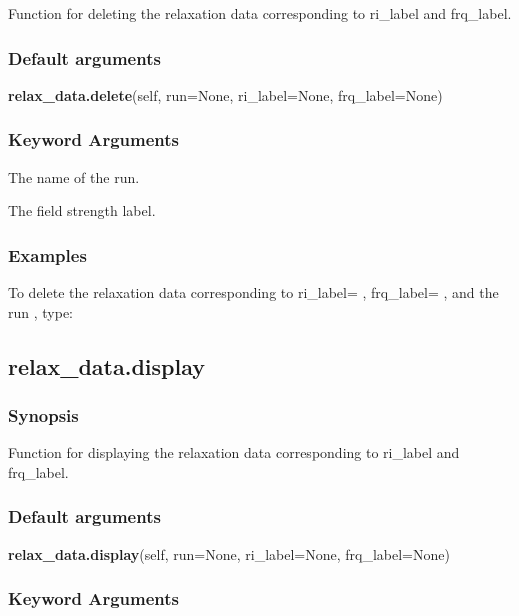 Function for deleting the relaxation data corresponding to ri\_label and frq\_label.

\subsubsection{Default arguments}

\textsf{\textbf{relax\_data.delete}(self, run=None, ri\_label=None, frq\_label=None)}


\subsubsection{Keyword Arguments}

  The name of the run.

  The field strength label.

\subsubsection{Examples}

To delete the relaxation data corresponding to ri\_label=
, frq\_label=
, and the run
, type:




\newpage

\subsection{relax\_data.display}


\subsubsection{Synopsis}

Function for displaying the relaxation data corresponding to ri\_label and frq\_label.

\subsubsection{Default arguments}

\textsf{\textbf{relax\_data.display}(self, run=None, ri\_label=None, frq\_label=None)}


\subsubsection{Keyword Arguments}


